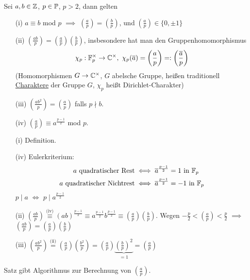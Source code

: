 \documentclass[a4paper,twoside,DIV15,BCOR12mm]{scrbook}
\begin{document}
\begin{satz}
Sei $a,b\in\mathbb{Z}$, $p \in \mathbb{P}$, $p>2$, dann gelten
\begin{enumerate}
\item[(i)] $a \equiv b$ mod $p$ $\implies$ $\left(\frac{a}{p}\right) = \left(\frac{b}{p}\right)$, und $\left(\frac{a}{p}\right) \in \{0,\pm 1\}$
\item[(ii)] $\left(\frac{ab}{p}\right) = \left(\frac{a}{p}\right)\left(\frac{b}{p}\right)$, insbesondere hat man den Gruppenhomomorphismus
\[
 \chi_p : \MdF_p^\times \to \MdC^\times,\ \chi_p(\overline a) =
\left(\frac{a}{p}\right) =: \left(\frac{\overline a}{p}\right)
\]
(Homomorphismen $G \to \mathbb{C}^\times$, $G$ abelsche Gruppe, heißen
traditionell \underline{Charaktere} der Gruppe $G$, $\chi_p$ heißt
Dirichlet-Charakter)
\item[(iii)] $\left(\frac{ab^2}{p}\right)=\left(\frac{a}{p}\right)$ falls $p \nmid b$.
\item[(iv)] $\left(\frac{a}{p}\right) \equiv a^{\frac{p-1}{2}}$ mod $p$.
\end{enumerate}
\end{satz}
\begin{beweis}
\begin{enumerate}
\item[(i)] Definition.
\item[(iv)]
Eulerkriterium:
    \begin{align*} a \text{ quadratischer Rest} & \iff \overline a ^{\frac{p-1}{2}} = 1 \text{ in } \mathbb{F}_p \\
                a \text{ quadratischer Nichtrest} & \iff  \overline a ^{\frac{p-1}{2}} = -1 \text{ in } \mathbb{F}_p
    \end{align*}
    $p \mid a$ $\iff$ $p \mid a^\frac{p-1}{2}$
\item[(ii)] $\left(\frac{ab}{p}\right) \stackrel{\mbox{(iv)}}{\equiv}(ab)^\frac{p-1}{2}\equiv a^\frac{p-1}{2} b^\frac{p-1}{2} \equiv \left(\frac{a}{p}\right)\left(\frac{b}{p}\right)$. Wegen $-\frac{p}{2}<\left(\frac{a}{p}\right)<\frac{p}{2}$ $\implies$ $\left(\frac{ab}{p}\right)=\left(\frac{a}{p}\right)\left(\frac{b}{p}\right)$
\item[(iii)] $\left(\frac{ab^2}{p}\right)\stackrel{\mbox{(ii)}}{=}\left(\frac{a}{p}\right)\left(\frac{b^2}{p}\right)=\left(\frac{a}{p}\right)\underbrace{\left(\frac{b}{p}\right)^2}_{=1}=\left(\frac{a}{p}\right)$
\end{enumerate}
\end{beweis}
Satz gibt Algorithmus zur Berechnung von $\left(\frac{a}{p}\right)$.
\end{document}

